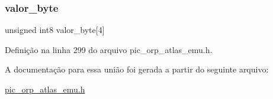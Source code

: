 \subsubsection{\texorpdfstring{valor\_byte}{valor\_byte}}
{\footnotesize\ttfamily unsigned int8 valor\+\_\+byte\mbox{[}4\mbox{]}}



Definição na linha 299 do arquivo pic\+\_\+orp\+\_\+atlas\+\_\+emu.\+h.



A documentação para essa união foi gerada a partir do seguinte arquivo\+:\begin{DoxyCompactItemize}
\item 
\mbox{\hyperlink{pic__orp__atlas__emu_8h}{pic\+\_\+orp\+\_\+atlas\+\_\+emu.\+h}}\end{DoxyCompactItemize}
